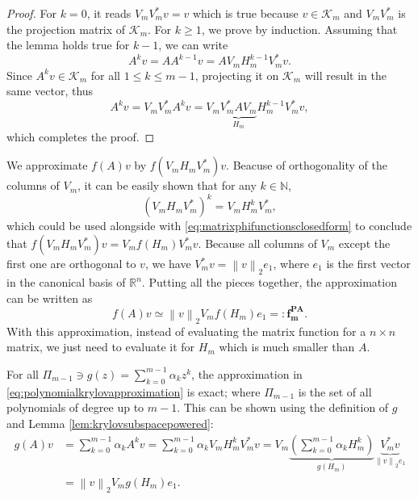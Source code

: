 \begin{proof}
    For $k=0$, it reads $V_m V_m^* v = v$ which is true because $v \in \mathcal{K}_m$
    and $V_m V_m^*$ is the projection matrix of $\mathcal{K}_m$.
    For $k \ge 1$, we prove by induction. Assuming that the lemma holds true for
    $k-1$, we can write
    \begin{equation*}
        A^{k} v = A A^{k-1} v = A V_m H_m^{k-1} V_m^* v.
    \end{equation*}
    Since $A^{k} v \in \mathcal{K}_m$ for all $1 \le k \le m-1$, projecting it on
    $\mathcal{K}_m$ will result in the same vector, thus
    \begin{equation*}
        A^{k} v = V_m V_m^* A^{k} v = V_m \underset{H_m}{\underbrace{V_m^* A V_m}} H_m^{k-1} V_m^* v,
    \end{equation*}
    which completes the proof.
\end{proof}

We approximate $f(A)v$ by $f(V_m H_m V_m^*)v$. Beacuse of orthogonality
of the columns of $V_m$, it can be easily shown that for any $k \in \mathbb{N}$,
\begin{equation*}
    \label{eq:reprojectionpower}
    (V_m H_m V_m^*)^{k} = V_m H_m^k V_m^*,
\end{equation*}
which could be used alongside with \eqref{eq:matrixphifunctionsclosedform} to conclude
that $f(V_m H_m V_m^*)v = V_m f(H_m) V_m^* v$.
Because all columns of $V_m$ except the first one are orthogonal to $v$, we have
$V_m^* v = \left\| v \right\|_{2} e_1$, where $e_1$ is the first vector in the
canonical basis of $\mathbb{R}^n$.
Putting all the pieces together, the approximation can be written as
\begin{equation}
    \label{eq:polynomialkrylovapproximation}
    f(A)v \simeq \left\| v \right\|_{2} V_m f(H_m) e_1 =: \mathbf{f_{m}^{PA}}.
\end{equation}
With this approximation, instead of evaluating the matrix function for
a $n \times n$ matrix, we just need to evaluate it for $H_m$ which is much
smaller than $A$.

\begin{corollary}
    \label{cor:univariateerrorestimationpolynomial}
    For all $\Pi_{m-1} \ni g(z) = \sum_{k=0}^{m-1}{\alpha_k} z^k$, the approximation
    in \eqref{eq:polynomialkrylovapproximation} is exact;
    where $\Pi_{m-1}$ is the set of all polynomials of degree up to $m-1$.
    This can be shown using the definition of $g$ and Lemma \ref{lem:krylovsubspacepowered}:
    \begin{equation*}
        \begin{aligned}
            g(A) v & = \sum_{k=0}^{m-1}{\alpha_k A^k v}
            = \sum_{k=0}^{m-1}{\alpha_k V_m H_m^k V_m^* v}
            = V_m \underset{g(H_m)}{\underbrace{\left( \sum_{k=0}^{m-1}{\alpha_k H_m^k } \right)}}
            \underset{\left\| v \right\|_2 e_1}{\underbrace{V_m^* v}}\\
            & = \left\| v \right\|_2 V_m g(H_m) e_1.
        \end{aligned}
    \end{equation*}
\end{corollary}

